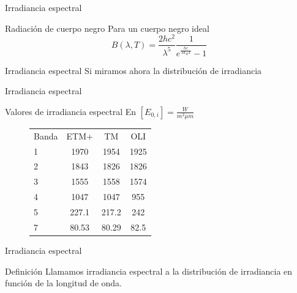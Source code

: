\documentclass[handout,draft]{beamer}
\begin{document}
\begin{frame}{Irradiancia espectral}
  \begin{block}{Radiación de cuerpo negro}
    Para un cuerpo negro ideal
    \begin{equation}
      B(\lambda,T) = \frac{2hc^2}{\lambda^5}\frac{1}{e^{\frac{hc}{\lambda k_B T}}-1}
    \end{equation}
  \end{block}
\end{frame}

\begin{frame}{Irradiancia espectral}
  Si miramos ahora la distribución de irradiancia
  \begin{figure}
  \end{figure}
\end{frame}

\begin{frame}{Irradiancia espectral}
  \begin{exampleblock}{Valores de irradiancia espectral}
    En $[E_{0,i}] = \frac{W}{m^2 \mu m}$
    \begin{figure}
      \begin{tabular}{l c c c}
          Banda & ETM+  & TM    &  OLI \\
          1     & 1970  & 1954  & 1925 \\
          2     & 1843  & 1826  & 1826 \\
          3     & 1555  & 1558  & 1574 \\
          4     & 1047  & 1047  & 955  \\
          5     & 227.1 & 217.2 & 242 \\
          7     & 80.53 & 80.29 & 82.5\\
      \end{tabular}
    \end{figure}
  \end{exampleblock}
\end{frame}

\begin{frame}{Irradiancia espectral}
  \begin{block}{Definición}
    Llamamos irradiancia espectral a la distribución de irradiancia en función de la longitud de onda.
  \end{block}
\end{frame}
\end{document}
